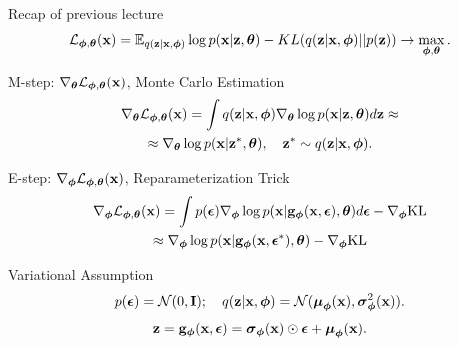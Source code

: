 \documentclass{beamer}
\begin{document}
\begin{frame}{Recap of previous lecture}
	\vspace{-0.3cm}
	\[
		\cL_{\bphi, \btheta}(\bx)  = \mathbb{E}_{q(\bz | \bx, \bphi)} \log p(\bx | \bz , \btheta) - KL(q(\bz| \bx, \bphi) || p(\bz)) \rightarrow \max_{\bphi, \btheta}.
	\]
	\vspace{-0.3cm}
	\begin{block}{M-step: $\nabla_{\btheta}\cL_{\bphi, \btheta}(\bx)$, Monte Carlo Estimation}
		\vspace{-0.8cm}
		\begin{multline*}
			\nabla_{\btheta}\cL_{\bphi, \btheta}(\bx)
			= \int q(\bz|\bx, \bphi) \nabla_{\btheta}\log p(\bx|\bz, \btheta) d \bz \approx  \\
			\approx \nabla_{\btheta}\log p(\bx|\bz^*, \btheta), \quad \bz^* \sim q(\bz|\bx, \bphi).
		\end{multline*}
		\vspace{-0.7cm}
	\end{block}
	\begin{block}{E-step: $\nabla_{\bphi}\cL_{\bphi, \btheta}(\bx)$, Reparameterization Trick}
		\vspace{-0.8cm}
		\begin{multline*}
			\nabla_{\bphi}\cL_{\bphi, \btheta}(\bx) = \int p(\bepsilon) \nabla_{\bphi} \log p(\bx | \bg_{\bphi}(\bx, \bepsilon), \btheta) d\bepsilon  - \nabla_{\bphi} \text{KL}
			\\ \approx \nabla_{\bphi} \log p(\bx | \bg_{\bphi}(\bx, \bepsilon^*), \btheta)  - \nabla_{\bphi} \text{KL}
		\end{multline*}
		\vspace{-0.5cm}
	\end{block}
	\vspace{-0.3cm}
	\begin{block}{Variational Assumption}
		\vspace{-0.3cm}
		\[
			p(\bepsilon) = \mathcal{N}(0, \bI); \quad  q(\bz| \bx, \bphi) = \mathcal{N} (\bmu_{\bphi}(\bx), \bsigma^2_{\bphi}(\bx)).
		\]
		\[
			\bz = \bg_{\bphi}(\bx, \bepsilon) = \bsigma_{\bphi}(\bx) \odot \bepsilon + \bmu_{\bphi}(\bx).
		\]
	\end{block}
\end{frame}
\end{document}
